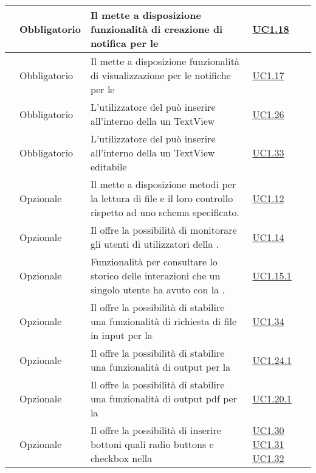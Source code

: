 \begin{longtable}{|P{1.5cm}|P{2.5cm}|P{6.5cm}|P{2.5cm}|}
	\hline \RequisitoObF\label{L15} & Obbligatorio & Il  mette a disposizione funzionalità di creazione di notifica per le  & \hyperref[UC1.18]{UC1.18} \\
	\hline \RequisitoObF\label{L16} & Obbligatorio & Il  mette a disposizione funzionalità di visualizzazione per le notifiche per le  & \hyperref[UC1.17]{UC1.17} \\
	\hline \RequisitoObF\label{L33} & Obbligatorio & L'utilizzatore del  può inserire all'interno della  un TextView & \hyperref[UC1.26]{UC1.26} \\
	\hline \RequisitoObF\label{L34} & Obbligatorio & L'utilizzatore del  può inserire all'interno della  un TextView editabile & \hyperref[UC1.33]{UC1.33} \\
	\hline \RequisitoOpF\label{L35} & Opzionale & Il  mette a disposizione metodi per la lettura di file  e il loro controllo rispetto ad uno schema specificato. & \hyperref[UC1.12]{UC1.12} \\
	\hline \RequisitoOpF\label{L36} & Opzionale & Il  offre la possibilità di monitorare gli utenti di  utilizzatori della . & \hyperref[UC1.14]{UC1.14} \\
	\hline \RequisitoOpF\label{L37} & Opzionale & Funzionalità per consultare lo storico delle interazioni che un singolo utente ha avuto con la . & \hyperref[UC1.15.1]{UC1.15.1} \\
	\hline \RequisitoOpF\label{L38} & Opzionale & Il  offre la possibilità di stabilire una funzionalità di richiesta di file in input per la  & \hyperref[UC1.34]{UC1.34} \\
	\hline \RequisitoOpF\label{L39} & Opzionale & Il  offre la possibilità di stabilire una funzionalità di output per la  & \hyperref[UC1.24.1]{UC1.24.1} \\
	\hline \RequisitoOpF\label{L40} & Opzionale & Il  offre la possibilità di stabilire una funzionalità di output pdf per la  & \hyperref[UC1.20.1]{UC1.20.1} \\	
	\hline \RequisitoOpF\label{L41} & Opzionale & Il  offre la possibilità di inserire bottoni quali radio buttons e checkbox nella  & \hyperref[UC1.30]{UC1.30} \linebreak \hyperref[UC1.31]{UC1.31} \linebreak \hyperref[UC1.32]{UC1.32} \\

\end{longtable}
